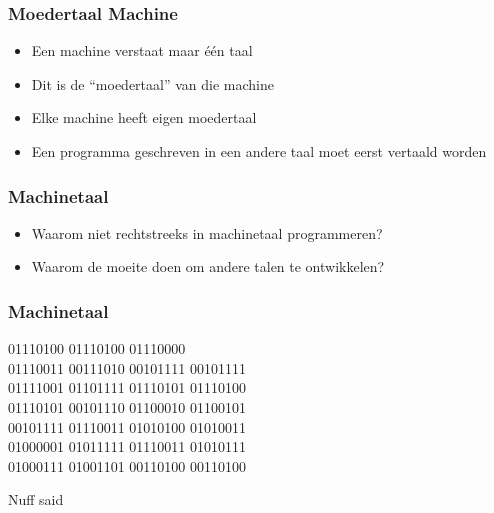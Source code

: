 \begin{frame}
  \frametitle{Moedertaal Machine}
  \begin{itemize}
    \item Een machine verstaat maar \'e\'en taal
    \item Dit is de ``moedertaal'' van die machine
    \item Elke machine heeft eigen moedertaal
    \item Een programma geschreven in een andere taal moet eerst vertaald worden
  \end{itemize}
\end{frame}

\begin{frame}
  \frametitle{Machinetaal}
  \begin{itemize}
    \item Waarom niet rechtstreeks in machinetaal programmeren?
    \item Waarom de moeite doen om andere talen te ontwikkelen?
  \end{itemize}
\end{frame}

\begin{frame}
  \frametitle{Machinetaal}
  \begin{center}  01110100 01110100 01110000 \\
    01110011 00111010 00101111 00101111 \\
    01111001 01101111 01110101 01110100 \\
    01110101 00101110 01100010 01100101 \\
    00101111 01110011 01010100 01010011 \\
    01000001 01011111 01110011 01010111 \\
    01000111 01001101 00110100 00110100 
  \end{center}
  \vskip5mm
  \begin{center}
    Nuff said
  \end{center}
\end{frame}

